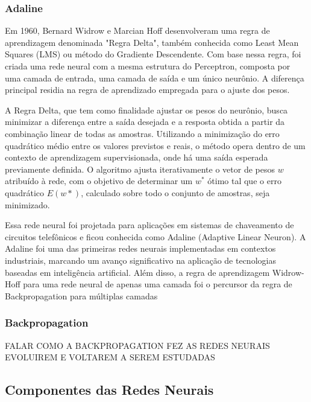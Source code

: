         \subsubsection{Adaline}

            Em 1960, Bernard Widrow e Marcian Hoff desenvolveram uma regra de aprendizagem denominada "Regra Delta", 
            também conhecida como Least Mean Squares (LMS) ou método do Gradiente Descendente. Com base nessa regra, 
            foi criada uma rede neural com a mesma estrutura do Perceptron, composta por uma camada de entrada, uma 
            camada de saída e um único neurônio. A diferença principal residia na regra de aprendizado empregada para 
            o ajuste dos pesos.
            
            A Regra Delta, que tem como finalidade ajustar os pesos do neurônio, busca minimizar a diferença entre a 
            saída desejada e a resposta obtida a partir da combinação linear de todas as amostras. Utilizando a 
            minimização do erro quadrático médio entre os valores previstos e reais, o método opera dentro de um 
            contexto de aprendizagem supervisionada, onde há uma saída esperada previamente definida. O algoritmo 
            ajusta iterativamente o vetor de pesos \( w\) atribuído à rede, com o objetivo de determinar um 
            \( w^{*} \) ótimo tal que o erro quadrático \({E(w{*})}\), calculado sobre todo o conjunto de amostras, 
            seja minimizado.

            Essa rede neural foi projetada para aplicações em sistemas de chaveamento de circuitos telefônicos e 
            ficou conhecida como Adaline (Adaptive Linear Neuron). A Adaline foi uma das primeiras redes neurais 
            implementadas em contextos industriais, marcando um avanço significativo na aplicação de tecnologias 
            baseadas em inteligência artificial. Além disso, a regra de aprendizagem Widrow-Hoff para uma rede neural 
            de apenas uma camada foi o percursor da regra de Backpropagation para múltiplas camadas~\cite{Fausett1994,silva2010}
        \subsubsection{Backpropagation}
      
            FALAR COMO A BACKPROPAGATION FEZ AS REDES NEURAIS EVOLUIREM E VOLTAREM A SEREM ESTUDADAS
    \subsection{Componentes das Redes Neurais}

